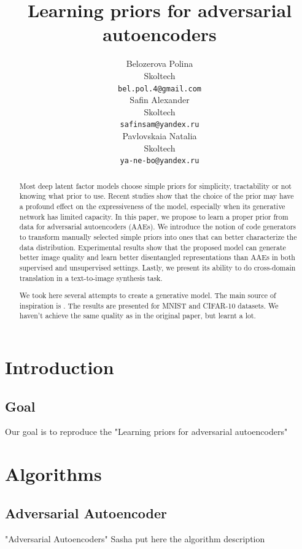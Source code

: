\documentclass{article}
\title{Learning priors for adversarial autoencoders}
\author{
Belozerova Polina\\
Skoltech\\
\texttt{bel.pol.4@gmail.com} \\
\And
Safin Alexander \\
Skoltech\\
\texttt{safinsam@yandex.ru} \\
\And
Pavlovskaia Natalia \\
Skoltech\\
\texttt{ya-ne-bo@yandex.ru} \\
}
\begin{document}
    \maketitle

    \begin{abstract}
        Most deep latent factor models choose simple priors for simplicity, tractability or
        not knowing what prior to use. Recent studies show that the choice of the prior
        may have a profound effect on the expressiveness of the model, especially when
        its generative network has limited capacity. In this paper, we propose to learn a
        proper prior from data for adversarial autoencoders (AAEs). We introduce the
        notion of code generators to transform manually selected simple priors into ones
        that can better characterize the data distribution. Experimental results show that
        the proposed model can generate better image quality and learn better disentangled
        representations than AAEs in both supervised and unsupervised settings. Lastly,
        we present its ability to do cross-domain translation in a text-to-image synthesis
        task.

        We took here several attempts to create a generative model. The main source of inspiration is \cite{original}.
        The results are presented for MNIST and CIFAR-10 datasets.
        We haven't achieve the same quality as in the original paper, but learnt a lot.
    \end{abstract}

    \section{Introduction}

    \subsection{Goal}
    Our goal is to reproduce the "Learning priors for adversarial autoencoders" \cite{original}

    \section{Algorithms}

    \subsection{Adversarial Autoencoder}
    "Adversarial Autoencoders" \cite{DBLP:journals/corr/MakhzaniSJG15}
    Sasha put here the algorithm description
\end{document}
